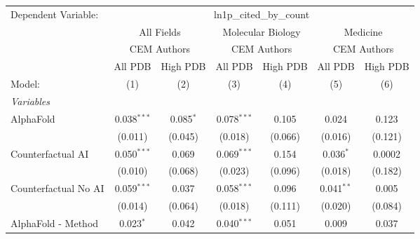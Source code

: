 \begingroup
\centering
\begin{tabular}{lcccccc}
   \tabularnewline \midrule \midrule
   Dependent Variable: & \multicolumn{6}{c}{ln1p\_cited\_by\_count}\\
 & \multicolumn{2}{c}{All Fields} & \multicolumn{2}{c}{Molecular Biology} & \multicolumn{2}{c}{Medicine} \\
\cmidrule(lr){2-3} \cmidrule(lr){4-5} \cmidrule(lr){6-7}
 & \multicolumn{2}{c}{CEM Authors} & \multicolumn{2}{c}{CEM Authors} & \multicolumn{2}{c}{CEM Authors} \\
\cmidrule(lr){2-3} \cmidrule(lr){4-5} \cmidrule(lr){6-7}
 & \multicolumn{1}{c}{All PDB} & \multicolumn{1}{c}{High PDB} & \multicolumn{1}{c}{All PDB} & \multicolumn{1}{c}{High PDB} & \multicolumn{1}{c}{All PDB} & \multicolumn{1}{c}{High PDB} \\
\cmidrule(lr){2-2} \cmidrule(lr){3-3} \cmidrule(lr){4-4} \cmidrule(lr){5-5} \cmidrule(lr){6-6} \cmidrule(lr){7-7}
   Model:                                                     & (1)            & (2)            & (3)           & (4)          & (5)            & (6)\\  
   \midrule
   \emph{Variables}\\
   AlphaFold                                                  & 0.038$^{***}$  & 0.085$^{*}$    & 0.078$^{***}$ & 0.105        & 0.024          & 0.123\\   
                                                              & (0.011)        & (0.045)        & (0.018)       & (0.066)      & (0.016)        & (0.121)\\   
   Counterfactual AI                                          & 0.050$^{***}$  & 0.069          & 0.069$^{***}$ & 0.154        & 0.036$^{*}$    & 0.0002\\   
                                                              & (0.010)        & (0.068)        & (0.023)       & (0.096)      & (0.018)        & (0.182)\\   
   Counterfactual No AI                                       & 0.059$^{***}$  & 0.037          & 0.058$^{***}$ & 0.096        & 0.041$^{**}$   & 0.005\\   
                                                              & (0.014)        & (0.064)        & (0.018)       & (0.111)      & (0.020)        & (0.084)\\   
   AlphaFold - Method                                         & 0.023$^{*}$    & 0.042          & 0.040$^{***}$ & 0.051        & 0.009          & 0.037\\   

\end{tabular}
